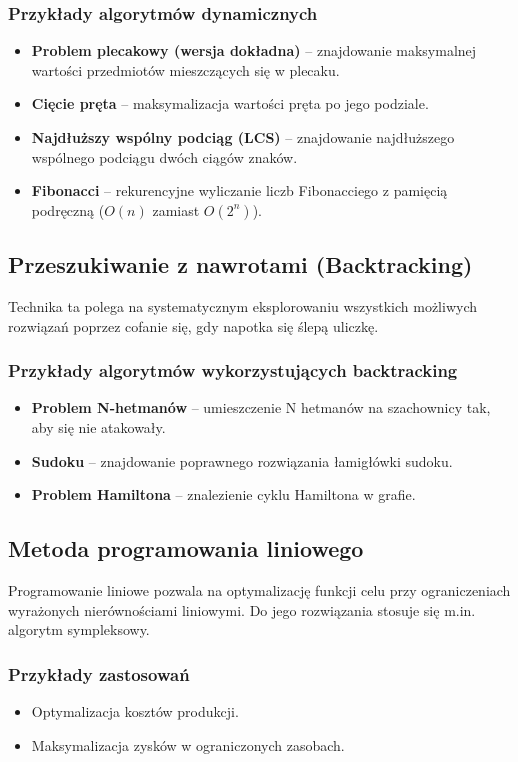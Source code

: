 \subsubsection{Przykłady algorytmów dynamicznych}
\begin{itemize}
    \item \textbf{Problem plecakowy (wersja dokładna)} – znajdowanie maksymalnej wartości przedmiotów mieszczących się w plecaku.
    \item \textbf{Cięcie pręta} – maksymalizacja wartości pręta po jego podziale.
    \item \textbf{Najdłuższy wspólny podciąg (LCS)} – znajdowanie najdłuższego wspólnego podciągu dwóch ciągów znaków.
    \item \textbf{Fibonacci} – rekurencyjne wyliczanie liczb Fibonacciego z pamięcią podręczną (\( O(n) \) zamiast \( O(2^n) \)).
\end{itemize}

\subsection{Przeszukiwanie z nawrotami (Backtracking)}
Technika ta polega na systematycznym eksplorowaniu wszystkich możliwych rozwiązań poprzez cofanie się, gdy napotka się ślepą uliczkę.

\subsubsection{Przykłady algorytmów wykorzystujących backtracking}
\begin{itemize}
    \item \textbf{Problem N-hetmanów} – umieszczenie N hetmanów na szachownicy tak, aby się nie atakowały.
    \item \textbf{Sudoku} – znajdowanie poprawnego rozwiązania łamigłówki sudoku.
    \item \textbf{Problem Hamiltona} – znalezienie cyklu Hamiltona w grafie.
\end{itemize}

\subsection{Metoda programowania liniowego}
Programowanie liniowe pozwala na optymalizację funkcji celu przy ograniczeniach wyrażonych nierównościami liniowymi. Do jego rozwiązania stosuje się m.in. algorytm sympleksowy.

\subsubsection{Przykłady zastosowań}
\begin{itemize}
    \item Optymalizacja kosztów produkcji.
    \item Maksymalizacja zysków w ograniczonych zasobach.
\end{itemize}

